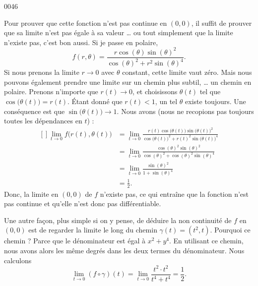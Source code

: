 
\begin{corrige}{0046}

Pour prouver que cette fonction n'est pas continue en $(0,0)$, il suffit de prouver que sa limite n'est pas égale à sa valeur \ldots{} ou tout simplement que la limite n'existe pas, c'est bon aussi. Si je passe en polaire,
\begin{equation}
	f(r,\theta)=\frac{ r\cos(\theta)\sin(\theta)^2 }{ \cos(\theta)^2+r^2\sin(\theta)^4 }.
\end{equation}
Si nous prenons la limite $r\to 0$ avec $\theta$ constant, cette limite vaut zéro. Mais nous pouvons également prendre une limite sur un chemin plus subtil, \ldots{} un chemin en polaire. Prenons n'importe que $r(t)\to 0$, et choisissons $\theta(t)$ tel que $\cos\big( \theta(t) \big)=r(t)$. Étant donné que $r(t)<1$, un tel $\theta$ existe toujours. Une conséquence est que $\sin\big( \theta(t) \big)\to 1$. Nous avons (nous ne recopions pas toujours toutes les dépendances en $t$) :
\begin{equation}
	\begin{aligned}[]
		\lim_{t\to 0}f\big( r(t),\theta(t) \big)	&=\lim_{t\to 0}\frac{ r(t)\cos\big( \theta(t) \big)\sin\big( \theta(t) \big)^2 }{ \cos\big( \theta(t) \big)^2+r(t)^2\sin\big( \theta(t) \big)^4 }\\
		&=\lim_{t\to 0}\frac{ \cos(\theta)^2\sin(\theta)^2 }{ \cos(\theta)^2+\cos(\theta)^2\sin(\theta)^4 }\\
		&=\lim_{t\to 0}\frac{ \sin(\theta)^2 }{ 1+\sin(\theta)^4 }\\
		&=\frac{ 1 }{2}.
	\end{aligned}
\end{equation}
Donc, la limite en $(0,0)$ de $f$ n'existe pas, ce qui entraîne que la fonction n'est pas continue et qu'elle n'est donc pas différentiable.

Une autre façon, plus simple si on y pense, de déduire la non continuité de $f$ en $(0,0)$ est de regarder la limite le long du chemin $\gamma(t)=(t^2,t)$. Pourquoi ce chemin ? Parce que le dénominateur est égal à $x^2+y^4$. En utilisant ce chemin, nous avons alors les même degrés dans les deux termes du dénominateur. Nous calculons
\begin{equation}
	\lim_{t\to 0}(f\circ\gamma)(t)=\lim_{t\to 0}\frac{ t^2\cdot t^2 }{ t^4+t^4 }=\frac{1}{ 2 }.
\end{equation}


\end{corrige}
